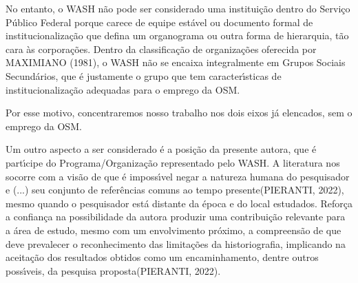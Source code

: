 \documentclass[
12pt,		%
openright,	%
twoside,  %
a4paper,			%
chapter=TITLE,		%
english,			%
french,				%
spanish,			%
brazil				%
]{USPSC-classe/USPSC}
\begin{document}
\noindent\begin{center}\mbox{\centering{}}\end{center}


No entanto, o WASH n\~ao pode ser considerado uma institui\c{c}\~ao dentro do Servi\c{c}o P\'ublico Federal porque carece de equipe est\'avel ou documento formal de institucionaliza\c{c}\~ao que defina um organograma ou outra forma de hierarquia, t\~ao cara \`as corpora\c{c}\~oes. Dentro da classifica\c{c}\~ao de organiza\c{c}\~oes oferecida por MAXIMIANO (1981), o WASH n\~ao se encaixa integralmente em \textquotedbl Grupos Sociais Secund\'arios\textquotedbl , que \'e justamente o grupo que tem caracter\'{\i}sticas de institucionaliza\c{c}\~ao adequadas para o emprego da OSM.

















Por esse motivo, concentraremos nosso trabalho nos dois eixos j\'a elencados, sem o emprego da OSM.

















Um outro aspecto a ser considerado \'e a posi\c{c}\~ao da presente autora, que \'e part\'{\i}cipe do Programa/Organiza\c{c}\~ao representado pelo WASH. A literatura nos socorre com a vis\~ao de que \'e imposs\'{\i}vel \textquotedbl negar a natureza humana do pesquisador e (...) seu conjunto de refer\^encias comuns ao tempo presente\textquotedbl  (PIERANTI, 2022), mesmo quando o pesquisador est\'a \textquotedbl distante da \'epoca e do local estudados\textquotedbl . Refor\c{c}a a confian\c{c}a na possibilidade da autora produzir uma contribui\c{c}\~ao relevante para a \'area de estudo, mesmo com um envolvimento pr\'oximo, a compreens\~ao de que \textquotedbl deve prevalecer o reconhecimento das limita\c{c}\~oes da historiografia, implicando na aceita\c{c}\~ao dos resultados obtidos como um encaminhamento, dentre outros poss\'{\i}veis, da pesquisa proposta\textquotedbl  (PIERANTI, 2022).
\end{document}
